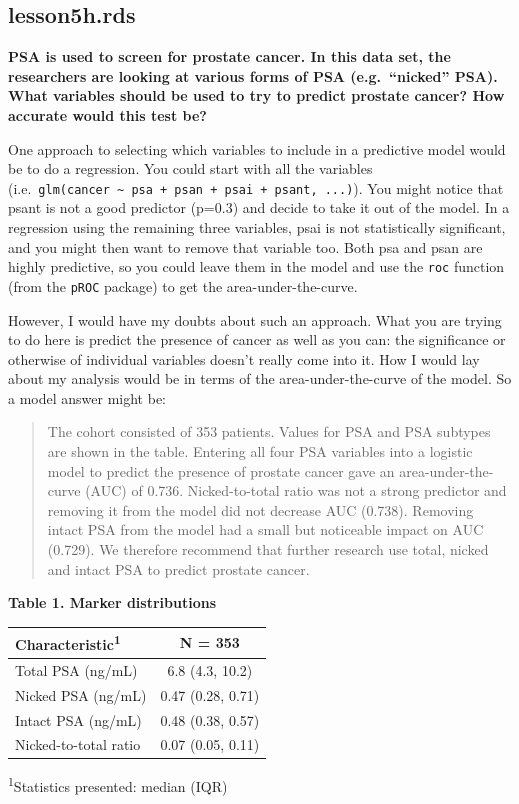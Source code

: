 \documentclass[]{book}
\begin{document}
\hypertarget{lesson5h.rds}{%
\subsection{lesson5h.rds}\label{lesson5h.rds}}

\textbf{PSA is used to screen for prostate cancer. In this data set, the researchers are looking at various forms of PSA (e.g.~``nicked'' PSA). What variables should be used to try to predict prostate cancer? How accurate would this test be?}

One approach to selecting which variables to include in a predictive model would be to do a regression. You could start with all the variables (i.e.~\texttt{glm(cancer\ \textasciitilde{}\ psa\ +\ psan\ +\ psai\ +\ psant,\ ...)}). You might notice that psant is not a good predictor (p=0.3) and decide to take it out of the model. In a regression using the remaining three variables, psai is not statistically significant, and you might then want to remove that variable too. Both psa and psan are highly predictive, so you could leave them in the model and use the \texttt{roc} function (from the \texttt{pROC} package) to get the area-under-the-curve.

However, I would have my doubts about such an approach. What you are trying to do here is predict the presence of cancer as well as you can: the significance or otherwise of individual variables doesn't really come into it. How I would lay about my analysis would be in terms of the area-under-the-curve of the model. So a model answer might be:

\begin{quote}
The cohort consisted of 353 patients. Values for PSA and PSA subtypes are shown in the table. Entering all four PSA variables into a logistic model to predict the presence of prostate cancer gave an area-under-the-curve (AUC) of 0.736. Nicked-to-total ratio was not a strong predictor and removing it from the model did not decrease AUC (0.738). Removing intact PSA from the model had a small but noticeable impact on AUC (0.729). We therefore recommend that further research use total, nicked and intact PSA to predict prostate cancer.
\end{quote}

\textbf{Table 1. Marker distributions}

\captionsetup[table]{labelformat=empty,skip=1pt}
\begin{longtable}{lc}
\toprule
\textbf{Characteristic}\textsuperscript{1} & \textbf{N = 353} \\ 
\midrule
Total PSA (ng/mL) & 6.8 (4.3, 10.2) \\ 
Nicked PSA (ng/mL) & 0.47 (0.28, 0.71) \\ 
Intact PSA (ng/mL) & 0.48 (0.38, 0.57) \\ 
Nicked-to-total ratio & 0.07 (0.05, 0.11) \\ 
\bottomrule
\end{longtable}
\vspace{-5mm}
\begin{minipage}{\linewidth}
\textsuperscript{1}Statistics presented: median (IQR) \\ 
\end{minipage}
\end{document}
